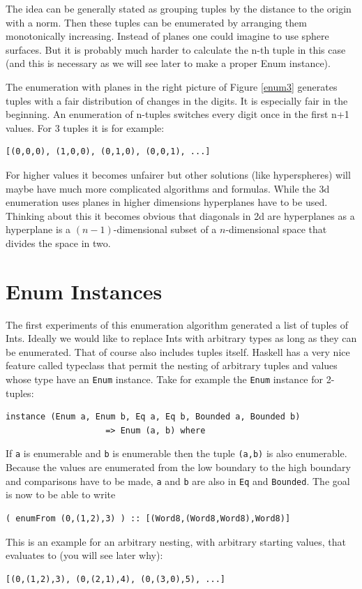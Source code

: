 \documentclass{tmr}
\newcommand{\authornote}[3]{{\color{#2} {\sc #1}: #3}}
\newcommand\bay[1]{\authornote{edward}{blue}{#1}}
\newcommand\tkv[1]{\authornote{Tillmann}{green}{#1}}
\begin{document}
The idea can be generally stated as grouping tuples by the distance to the origin with a norm. Then these tuples can be enumerated by arranging them monotonically increasing. Instead of planes one could imagine to use sphere surfaces. But it is probably much harder to calculate the n-th tuple in this case (and this is necessary as we will see later to make a proper Enum instance).

The enumeration with planes in the right picture of Figure \ref{enum3} generates tuples with a fair distribution of changes in the digits. It is especially fair in the beginning. An enumeration of n-tuples switches every digit once in the first n+1 values. For 3 tuples it is for example:
\begin{Verbatim}
[(0,0,0), (1,0,0), (0,1,0), (0,0,1), ...]
\end{Verbatim}
For higher values it becomes unfairer but other solutions (like hyperspheres) will maybe have much more complicated algorithms and formulas.
While the 3d enumeration uses planes in higher dimensions hyperplanes have to be used. Thinking about this it becomes obvious that diagonals in 2d are hyperplanes as a hyperplane is a $(n-1)$-dimensional subset of a $n$-dimensional space that divides the space in two.

\section{Enum Instances}
The first experiments of this enumeration algorithm generated a list of tuples of Ints. Ideally we would like to replace Ints with arbitrary types as long as they can be enumerated. That of course also includes tuples itself. Haskell has a very nice feature called typeclass that permit the nesting of arbitrary tuples and values whose type have an \verb|Enum| instance. Take for example the \verb|Enum| instance for 2-tuples:

\begin{Verbatim}
instance (Enum a, Enum b, Eq a, Eq b, Bounded a, Bounded b)
                    => Enum (a, b) where
\end{Verbatim}
If \verb|a| is enumerable and \verb|b| is enumerable then the tuple \verb|(a,b)| is also enumerable. Because the values are enumerated from the low boundary to the high boundary and comparisons have to be made, \verb|a| and \verb|b| are also in \verb|Eq| and \verb|Bounded|. %
The goal is now to be able to write
\begin{Verbatim}
( enumFrom (0,(1,2),3) ) :: [(Word8,(Word8,Word8),Word8)]
\end{Verbatim}
This is an example for an arbitrary nesting, with arbitrary starting values, that evaluates to (you will see later why):
\begin{Verbatim}
[(0,(1,2),3), (0,(2,1),4), (0,(3,0),5), ...]
\end{Verbatim}
\end{document}
